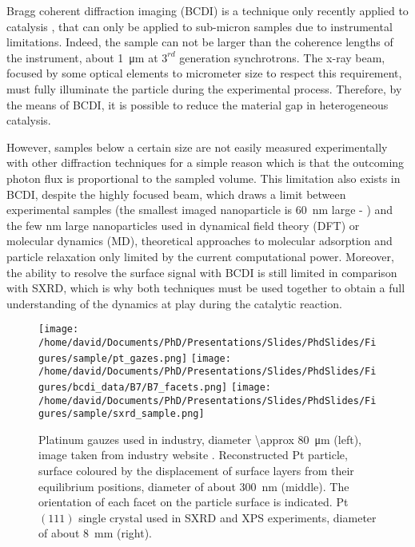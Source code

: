 Bragg coherent diffraction imaging (BCDI) is a technique only recently applied to catalysis \parencite{Ulvestad2016}, that can only be applied to sub-micron samples due to instrumental limitations.
Indeed, the sample can not be larger than the coherence lengths of the instrument, about \qty{1}{\um} at $3^{rd}$ generation synchrotrons.
The x-ray beam, focused by some optical elements to micrometer size to respect this requirement, must fully illuminate the particle during the experimental process.
Therefore, by the means of BCDI, it is possible to reduce the material gap in heterogeneous catalysis.

However, samples below a certain size are not easily measured experimentally with other diffraction techniques for a simple reason which is that the outcoming photon flux is proportional to the sampled volume.
This limitation also exists in BCDI, despite the highly focused beam, which draws a limit between experimental samples (the smallest imaged nanoparticle is \qty{60}{\nm} large - \cite{Bjorling2019, Carnis2021}) and the few \unit{\nm} large nanoparticles used in dynamical field theory (DFT) or molecular dynamics (MD), theoretical approaches to molecular adsorption and particle relaxation only limited by the current computational power.
Moreover, the ability to resolve the surface signal with BCDI is still limited in comparison with SXRD, which is why both techniques must be used together to obtain a full understanding of the dynamics at play during the catalytic reaction.

\begin{figure}[!htb]
    \centering
    \texttt{[image: /home/david/Documents/PhD/Presentations/Slides/PhdSlides/Figures/sample/pt\_gazes.png]}
    \texttt{[image: /home/david/Documents/PhD/Presentations/Slides/PhdSlides/Figures/bcdi\_data/B7/B7\_facets.png]}
    \texttt{[image: /home/david/Documents/PhD/Presentations/Slides/PhdSlides/Figures/sample/sxrd\_sample.png]}
    \caption{
    Platinum gauzes used in industry, diameter \qty{\approx 80}{\um} (left), image taken from industry website \parencite{PtRhGauze}.
    Reconstructed Pt particle, surface coloured by the displacement of surface layers from their equilibrium positions, diameter of about \qty{300}{\nm} (middle).
    The orientation of each facet on the particle surface is indicated.
    Pt $(111)$ single crystal used in SXRD and XPS experiments, diameter of about \qty{8}{\mm} (right).
    }
\end{figure}

